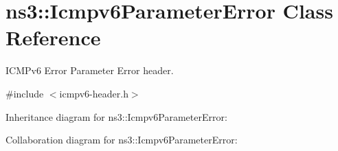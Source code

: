 \hypertarget{classns3_1_1Icmpv6ParameterError}{}\section{ns3\+:\+:Icmpv6\+Parameter\+Error Class Reference}
\label{classns3_1_1Icmpv6ParameterError}


I\+C\+M\+Pv6 Error Parameter Error header.  




{\ttfamily \#include $<$icmpv6-\/header.\+h$>$}



Inheritance diagram for ns3\+:\+:Icmpv6\+Parameter\+Error\+:


Collaboration diagram for ns3\+:\+:Icmpv6\+Parameter\+Error\+:

